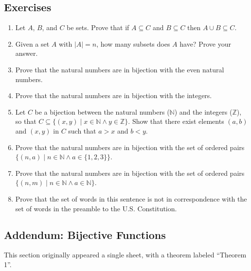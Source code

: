 \subsection{Exercises}
\begin{enumerate}
    \item Let $A$, $B$, and $C$ be sets.  Prove that if $A \subseteq C$ and $B \subseteq C$ then $A \cup B \subseteq C$.

    \item Given a set $A$ with $|A|=n$, how many subsets does $A$ have?  Prove your answer.

    \item Prove that the natural numbers are in bijection with the even natural numbers.

    \item Prove that the natural numbers are in bijection with the integers.

    \item Let $C$ be a bijection between the natural numbers ($\mathbb{N}$) and the integers ($\mathbb{Z}$), so that $C\subseteq\{(x,y)\mid x\in \mathbb{N}\land y\in\mathbb{Z}\}$.  Show that there exist elements $(a, b)$ and $(x,y)$ in $C$ such that $a > x$ and $b < y$.

    \item Prove that the natural numbers are in bijection with the set of ordered pairs $\{(n, a) \mid n\in \mathbb{N} \land a \in \{1,2,3\}\}$.

    \item Prove that the natural numbers are in bijection with the set of ordered pairs $\{(n, m) \mid n\in \mathbb{N} \land a \in \mathbb{N}\}$.

    \item Prove that the set of words in this sentence is not in correspondence with the set of words in the preamble to the U.S. Constitution.
\end{enumerate}

\subsection{Addendum: Bijective Functions}
This section originally appeared a single sheet, with a theorem labeled ``Theorem 1''.

